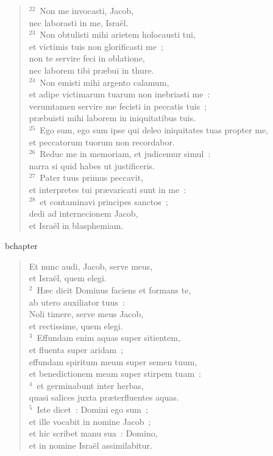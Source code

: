 \begin{verse}${}^{22}$~Non me invocasti, Jacob,\\ nec laborasti in me, Isra\"el.\\
${}^{23}$~Non obtulisti mihi arietem holocausti tui,\\ et victimis tuis non glorificasti me~;\\ non te servire feci in oblatione,\\ nec laborem tibi pr\ae bui in thure.\\
${}^{24}$~Non emisti mihi argento calamum,\\ et adipe victimarum tuarum non inebriasti me~:\\ verumtamen servire me fecisti in peccatis tuis~;\\ pr\ae buisti mihi laborem in iniquitatibus tuis.\\
${}^{25}$~Ego sum, ego sum ipse qui deleo iniquitates tuas propter me,\\ et peccatorum tuorum non recordabor.\\
${}^{26}$~Reduc me in memoriam, et judicemur simul~:\\ narra si quid habes ut justificeris.\\
${}^{27}$~Pater tuus primus peccavit,\\ et interpretes tui pr\ae varicati sunt in me~:\\
${}^{28}$~et contaminavi principes sanctos~;\\ dedi ad internecionem Jacob,\\ et Isra\"el in blasphemiam.\end{verse}


bchapter\begin{verse}\vspace{-19pt}Et nunc audi, Jacob, serve meus,\\ et Isra\"el, quem elegi.\\
${}^{2}$~H\ae c dicit Dominus faciens et formans te,\\ ab utero auxiliator tuus~:\\ Noli timere, serve meus Jacob,\\ et rectissime, quem elegi.\\
${}^{3}$~Effundam enim aquas super sitientem,\\ et fluenta super aridam~;\\ effundam spiritum meum super semen tuum,\\ et benedictionem meam super stirpem tuam~:\\
${}^{4}$~et germinabunt inter herbas,\\ quasi salices juxta pr\ae terfluentes aquas.\\
${}^{5}$~Iste dicet~: Domini ego sum~;\\ et ille vocabit in nomine Jacob~;\\ et hic scribet manu sua~: Domino,\\ et in nomine Isra\"el assimilabitur.\end{verse}


